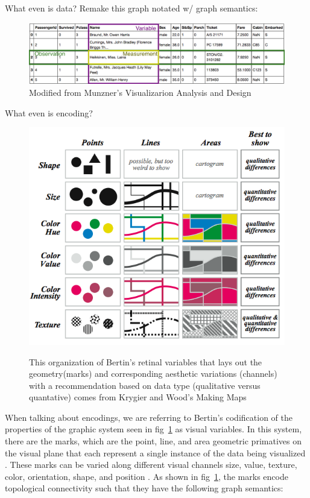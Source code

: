 \documentclass[letterpaper,onecolumn,titlepage]{Ythesis}
\begin{document}
 What even is data?
 Remake this graph notated w/ graph semantics:
 \begin{figure}
    \includegraphics{figures/intro/data_formatting}
    \caption{Modified from Munzner's Visualizarion Analysis and Design}
 \end{figure}

 What even is encoding?
 \begin{figure}
    \includegraphics{figures/intro/retinal_variables}
    \label{fig:retinal_variable}
    \caption{This organization of Bertin's retinal variables \cite{bertinSemiologyGraphicsDiagrams2011} that lays out the geometry(marks) and corresponding aesthetic variations (channels) with a recommendation based on data type (qualitative versus quantative) comes from Krygier and Wood's Making Maps \cite{krygierMakingMapsVisual2005}}
\end{figure}

When talking about encodings, we are referring to Bertin's codification of the properties of the graphic system \cite{bertinIIPropertiesGraphic2011} seen in fig~\ref{fig:retinal_variable} as visual variables. In this system, there are the marks, which are the point, line, and area geometric primatives on the visual plane that each represent a single instance of the data being visualized \cite{bertinIIPropertiesGraphic2011,munznerMarksChannels2014}. These marks can be varied along different visual channels  size, value, texture, color, orientation, shape, and position \cite{bertinIIPropertiesGraphic2011, munznerMarksChannels2014}. As shown in fig~\ref{fig:retinal_variable}, the marks encode topological connectivity such that they have the following graph semantics:
\end{document}
